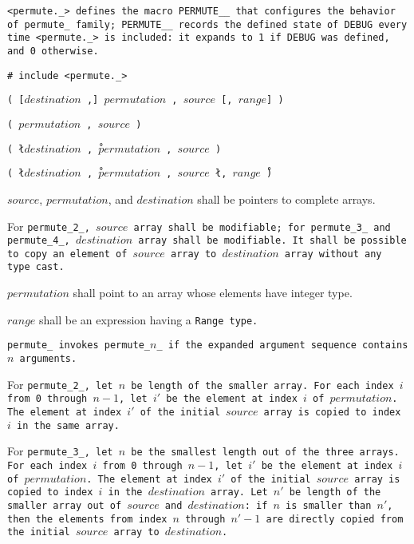 \tt{<permute._>} defines the macro \tt{PERMUTE__} that configures the
behavior of \tt{permute_} family;  \tt{PERMUTE__} records the \tt{defined}
state of \tt{DEBUG} every time \tt{<permute._>} is included:
it expands to \tt{1} if \tt{DEBUG} was defined, and \tt{0} otherwise.


\tt{# include <permute._>}

\s\s\s\tt{(} [$destination$ \tt{,}]
$permutation$ \tt{,} $source$ [\tt{,} $range$] \tt{)}

\s\tt{(} $permutation$ \tt{,} $source$ \tt{)}

\s\tt{(} \l$destination$ \tt{,}\r\
$permutation$ \tt{,} $source$ \tt{)}

\s\tt{(} \l$destination$ \tt{,}\r\
$permutation$ \tt{,} $source$ \l\tt{,}  $range$\r\ \tt{)}


$source$, $permutation$, and $destination$ shall be pointers to complete arrays.

For \tt{permute_2_}, $source$ array shall be modifiable;
for \tt{permute_3_} and \tt{permute_4_}, $destination$ array shall be modifiable.
It shall be possible to copy an element of $source$
array to $destination$ array without any type cast.

$permutation$ shall point to an array whose elements have integer type.

$range$ shall be an expression having a \tt{Range} type.


\tt{permute_} invokes  \tt{permute_}$n$\_ if the
expanded argument sequence contains $n$ arguments.

For \tt{permute_2_}, let $n$ be length of the smaller array.
For each index $i$ from 0 through $n - 1$,
let $i'$ be the element at index $i$ of $permutation$.
The element at index $i'$ of the initial $source$
array is copied to index $i$ in the same array.

For \tt{permute_3_}, let $n$ be the smallest length out of the three arrays.
For each index $i$ from 0 through $n - 1$,
let $i'$ be the element at index $i$ of $permutation$.
The element at index $i'$ of the initial $source$ array
is copied to index $i$ in the $destination$ array.
Let $n'$ be length of the smaller array out of $source$ and $destination$:
if $n$ is smaller than $n'$, then the elements from index $n$ through $n' - 1$
are directly copied from the initial $source$ array to $destination$.

